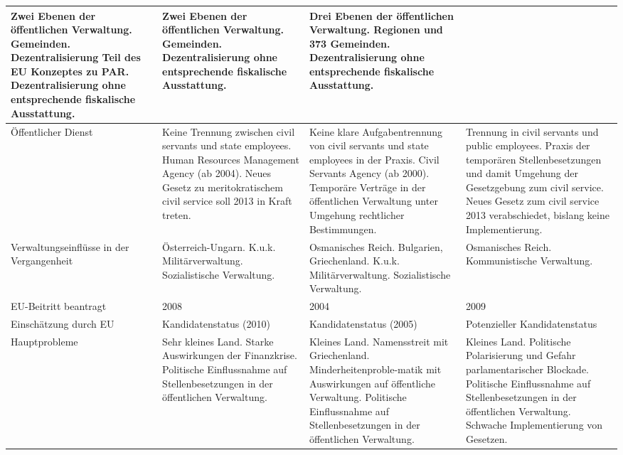 \begin{footnotesize}
\begin{longtable}[H]{|M{30mm}|C{35mm}|C{35mm}|C{35mm}|}
Zwei Ebenen der öffentlichen Verwaltung. Gemeinden.
Dezentralisierung Teil des EU Konzeptes zu PAR.
Dezentralisierung ohne entsprechende fiskalische Ausstattung.&
Zwei Ebenen der öffentlichen Verwaltung.  Gemeinden.
Dezentralisierung ohne entsprechende fiskalische Ausstattung. &
Drei Ebenen der öffentlichen Verwaltung. Regionen und 373 Gemeinden.
Dezentralisierung ohne entsprechende fiskalische Ausstattung. \\\hline
Öffentlicher Dienst&
Keine Trennung zwischen civil servants und state employees.\newline
Human Resources Management Agency 
(ab 2004).\newline
Neues Gesetz zu meritokratischem civil service soll 2013 in Kraft treten.&
 Keine klare Aufgabentrennung von civil servants und state employees in der Praxis.\newline
Civil Servants Agency (ab 2000).
Temporäre Verträge in der öffentlichen Verwaltung unter Umgehung rechtlicher Bestimmungen.&
Trennung in civil servants und public employees. \newline
Praxis der temporären Stellenbesetzungen und damit Umgehung der Gesetzgebung zum civil service.\newline
Neues Gesetz zum civil service 2013 verabschiedet, bislang keine Implementierung.\\\hline
Verwaltungseinflüsse in der Vergangenheit&
Österreich-Ungarn.
K.u.k. Militärverwaltung.
Sozialistische Verwaltung.&
Osmanisches Reich.
Bulgarien, Griechenland. 
K.u.k. Militärverwaltung.
Sozialistische Verwaltung.&
Osmanisches Reich. 
Kommunistische Verwaltung. \\\hline
EU-Beitritt beantragt&
2008&
2004&
2009\\\hline
Einschätzung durch EU&Kandidatenstatus (2010)&
Kandidatenstatus (2005)&
Potenzieller Kandidatenstatus\\\hline
Hauptprobleme&
Sehr kleines Land.
Starke Auswirkungen der Finanzkrise.
Politische Einflussnahme auf Stellenbesetzungen in der öffentlichen Verwaltung.&
Kleines Land.
Namensstreit mit Griechenland.\newline
Minderheitenproble-matik mit Auswirkungen auf öffentliche Verwaltung.
Politische Einflussnahme auf Stellenbesetzungen in der öffentlichen Verwaltung.&
Kleines Land.
Politische Polarisierung und Gefahr parlamentarischer Blockade.\newline
Politische Einflussnahme auf Stellenbesetzungen in der öffentlichen Verwaltung.
Schwache Implementierung von Gesetzen.\\\hline
\end{longtable}
\end{footnotesize}

